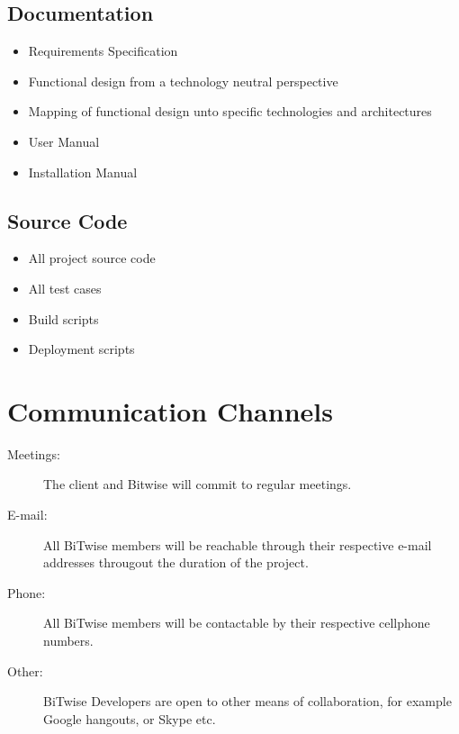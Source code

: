 \documentclass[a4paper]{article}
\begin{document}
    \subsection{Documentation}

			\begin{itemize}
				\item Requirements Specification
				\item Functional design from a technology neutral perspective
				\item Mapping of functional design unto specific technologies and architectures
				\item User Manual
				\item Installation Manual
			\end{itemize}

		\subsection{Source Code}

			\begin{itemize}
				\item All project source code
				\item All test cases
				\item Build scripts
				\item Deployment scripts
			\end{itemize}

	\section{Communication Channels}
    
	\begin{description}
			\item [Meetings:] The client and Bitwise will commit to regular meetings.
			\item [E-mail:] All BiTwise members will be reachable through their respective e-mail addresses 				througout the duration of the project.
			\item [Phone:] All BiTwise members will be contactable by their respective cellphone numbers.
			\item [Other:] BiTwise Developers are open to other means of collaboration, for example Google 					hangouts, or Skype etc.
	\end{description}
    
    
\end{document}
